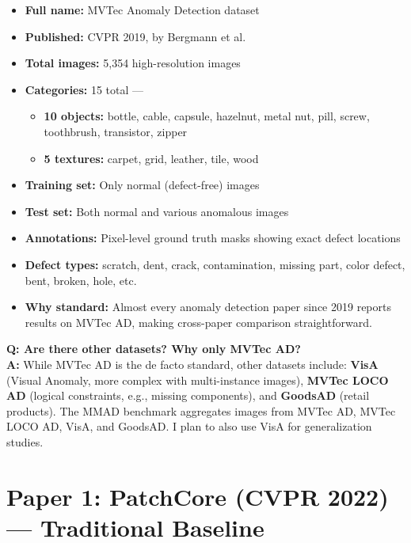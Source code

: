 \documentclass[12pt, a4paper]{article}
\begin{document}
\begin{itemize}[leftmargin=*]
    \item \textbf{Full name:} MVTec Anomaly Detection dataset
    \item \textbf{Published:} CVPR 2019, by Bergmann et al.
    \item \textbf{Total images:} 5,354 high-resolution images
    \item \textbf{Categories:} 15 total ---
    \begin{itemize}
        \item \textbf{10 objects:} bottle, cable, capsule, hazelnut, metal nut, pill, screw, toothbrush, transistor, zipper
        \item \textbf{5 textures:} carpet, grid, leather, tile, wood
    \end{itemize}
    \item \textbf{Training set:} Only normal (defect-free) images
    \item \textbf{Test set:} Both normal and various anomalous images
    \item \textbf{Annotations:} Pixel-level ground truth masks showing exact defect locations
    \item \textbf{Defect types:} scratch, dent, crack, contamination, missing part, color defect, bent, broken, hole, etc.
    \item \textbf{Why standard:} Almost every anomaly detection paper since 2019 reports results on MVTec AD, making cross-paper comparison straightforward.
\end{itemize}

\begin{vivaqa}
\textbf{Q: Are there other datasets? Why only MVTec AD?}\\[4pt]
\textbf{A:} While MVTec AD is the de facto standard, other datasets include: \textbf{VisA} (Visual Anomaly, more complex with multi-instance images), \textbf{MVTec LOCO AD} (logical constraints, e.g., missing components), and \textbf{GoodsAD} (retail products). The MMAD benchmark aggregates images from MVTec AD, MVTec LOCO AD, VisA, and GoodsAD. I plan to also use VisA for generalization studies.
\end{vivaqa}



\section{Paper 1: PatchCore (CVPR 2022) --- Traditional Baseline}
\end{document}
